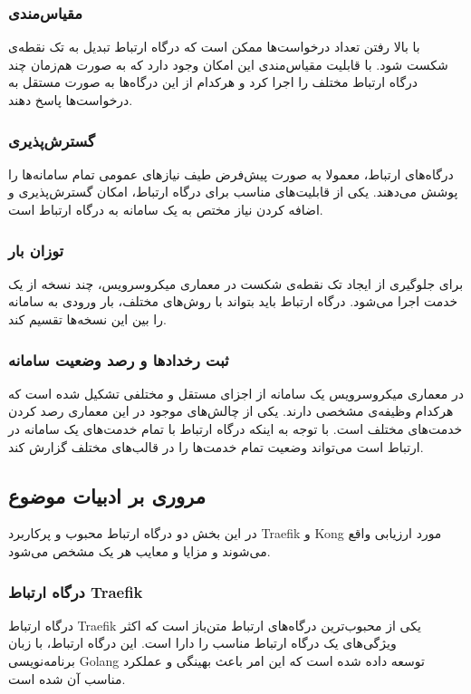 \subsubsection{مقیاس‌مندی}
با بالا رفتن تعداد درخواست‌ها ممکن است که درگاه ارتباط تبدیل به تک نقطه‌ی شکست
شود. با قابلیت مقیاس‌مندی این امکان وجود دارد که به صورت هم‌زمان چند درگاه ارتباط مختلف را اجرا کرد و هر‌کدام از این درگاه‌ها به صورت مستقل به درخواست‌ها پاسخ دهند.

\subsubsection{گسترش‌پذیری}
درگاه‌های ارتباط، معمولا به صورت پیش‌فرض طیف نیازهای عمومی تمام سامانه‌ها را پوشش می‌دهند. یکی از قابلیت‌های مناسب برای درگاه ارتباط، امکان گسترش‌پذیری و اضافه کردن نیاز مختص به یک سامانه به درگاه ارتباط است.

\subsubsection{توزان بار}
برای جلوگیری از ایجاد تک نقطه‌ی شکست در معماری میکروسرویس، چند نسخه از یک خدمت اجرا می‌شود. درگاه ارتباط باید بتواند با روش‌های مختلف، بار ورودی به سامانه را بین این نسخه‌ها تقسیم کند.

\subsubsection{ثبت رخداد‌ها و رصد وضعیت سامانه}
در معماری میکروسرویس یک سامانه از اجزای مستقل و مختلفی تشکیل شده است که هر‌کدام وظیفه‌ی مشخصی دارند. یکی از چالش‌های موجود در این معماری رصد کردن خدمت‌های مختلف است. با توجه به اینکه درگاه ارتباط با تمام خدمت‌های یک سامانه در ارتباط است می‌تواند وضعیت تمام خدمت‌ها را در قالب‌های مختلف گزارش کند.


\subsection{مروری بر ادبیات موضوع}\label{subsec:sources_literature}
در این بخش دو درگاه ارتباط محبوب و پرکاربرد Traefik و Kong مورد ارزیابی واقع می‌شوند و مزایا و معایب هر یک مشخص می‌شود.

\subsubsection{درگاه ارتباط Traefik}
درگاه ارتباط Traefik یکی از محبوب‌ترین درگاه‌های ارتباط متن‌باز است که اکثر ویژگی‌های یک درگاه ارتباط مناسب را دارا است. این درگاه ارتباط، با زبان برنامه‌نویسی Golang توسعه داده شده است که این امر باعث بهینگی و عملکرد مناسب آن شده است.

